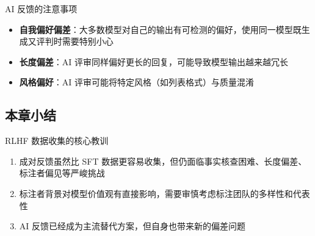 \begin{knowledgebox}{AI 反馈的注意事项}
\begin{itemize}
    \item \textbf{自我偏好偏差}：大多数模型对自己的输出有可检测的偏好，使用同一模型既生成又评判时需要特别小心
    \item \textbf{长度偏差}：AI 评审同样偏好更长的回复，可能导致模型输出越来越冗长
    \item \textbf{风格偏好}：AI 评审可能将特定风格（如列表格式）与质量混淆
\end{itemize}
\end{knowledgebox}

\subsection{本章小结}

\begin{importantbox}{RLHF 数据收集的核心教训}
\begin{enumerate}
    \item 成对反馈虽然比 SFT 数据更容易收集，但仍面临事实核查困难、长度偏差、标注者偏见等严峻挑战
    \item 标注者背景对模型价值观有直接影响，需要审慎考虑标注团队的多样性和代表性
    \item AI 反馈已经成为主流替代方案，但自身也带来新的偏差问题
\end{enumerate}
\end{importantbox}


